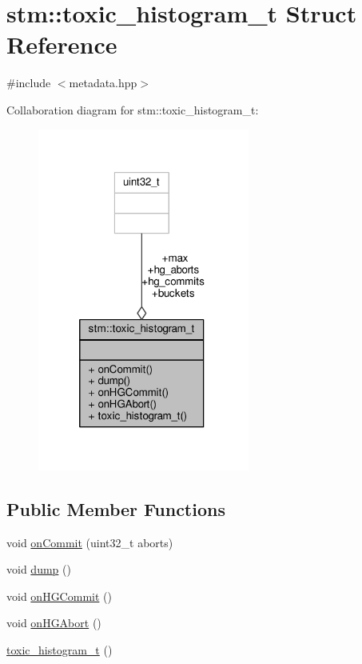 \hypertarget{structstm_1_1toxic__histogram__t}{\section{stm\-:\-:toxic\-\_\-histogram\-\_\-t Struct Reference}
\label{structstm_1_1toxic__histogram__t}
}


{\ttfamily \#include $<$metadata.\-hpp$>$}



Collaboration diagram for stm\-:\-:toxic\-\_\-histogram\-\_\-t\-:
\nopagebreak
\begin{figure}[H]
\begin{center}
\leavevmode
\includegraphics[width=197pt]{structstm_1_1toxic__histogram__t__coll__graph}
\end{center}
\end{figure}
\subsection*{Public Member Functions}
\begin{DoxyCompactItemize}
\item 
void \hyperlink{structstm_1_1toxic__histogram__t_a31bcf74fa119d35372d23cf6bc6c26d2}{on\-Commit} (uint32\-\_\-t aborts)
\item 
void \hyperlink{structstm_1_1toxic__histogram__t_a67465241133cd9695f0418632dfbd291}{dump} ()
\item 
void \hyperlink{structstm_1_1toxic__histogram__t_a7d6a2bc3d8be3a6cb7d7cda65379c01d}{on\-H\-G\-Commit} ()
\item 
void \hyperlink{structstm_1_1toxic__histogram__t_a87a2e657cd6e6a2142feafb9b7c3172e}{on\-H\-G\-Abort} ()
\item 
\hyperlink{structstm_1_1toxic__histogram__t_a7db09137bfa8631fca2076107f82dfa5}{toxic\-\_\-histogram\-\_\-t} ()
\end{DoxyCompactItemize}
